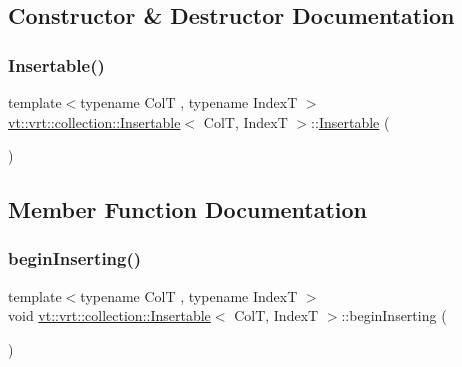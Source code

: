 \subsection{Constructor \& Destructor Documentation}
\mbox{\label{structvt_1_1vrt_1_1collection_1_1_insertable_afc3dfcc785bd431f0b4d8d678cbff29f}} 
\subsubsection{\texorpdfstring{Insertable()}{Insertable()}}
{\footnotesize\ttfamily template$<$typename ColT , typename IndexT $>$ \\
\hyperlink{structvt_1_1vrt_1_1collection_1_1_insertable}{vt\+::vrt\+::collection\+::\+Insertable}$<$ ColT, IndexT $>$\+::\hyperlink{structvt_1_1vrt_1_1collection_1_1_insertable}{Insertable} (\begin{DoxyParamCaption}{ }\end{DoxyParamCaption})\hspace{0.3cm}{\ttfamily [default]}}



\subsection{Member Function Documentation}
\mbox{\label{structvt_1_1vrt_1_1collection_1_1_insertable_abe80dfadbd83ac7cd64922fdf1a38a9c}} 
\subsubsection{\texorpdfstring{begin\+Inserting()}{beginInserting()}}
{\footnotesize\ttfamily template$<$typename ColT , typename IndexT $>$ \\
void \hyperlink{structvt_1_1vrt_1_1collection_1_1_insertable}{vt\+::vrt\+::collection\+::\+Insertable}$<$ ColT, IndexT $>$\+::begin\+Inserting (\begin{DoxyParamCaption}{ }\end{DoxyParamCaption})}

